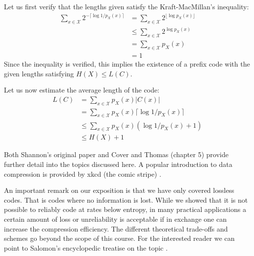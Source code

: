 \begin{solution}
Let us first verify that the lengths given satisfy the Kraft-MacMillan's inequality:
\begin{align}
\sum_{x\in\mathcal X}2^{-\lceil \log 1/p_X(x)\rceil}&=\sum_{x\in\mathcal X}2^{\lfloor \log p_X(x)\rfloor}\\
&\leq \sum_{x\in\mathcal X}2^{\log p_X(x)}\\
&=\sum_{x\in\mathcal X}{p_X(x)}\\
&=1
\end{align}
Since the inequality is verified, this implies the existence of a prefix code with the given lengths satisfying $H(X)\leq L(C)$. 

Let us now estimate the average length of the code:
\begin{align}
L(C)&=\sum_{x\in\mathcal X}p_X(x)|C(x)|\\
    &=\sum_{x\in\mathcal X}p_X(x)\lceil \log 1/p_X(x)\rceil\\
    &\leq \sum_{x\in\mathcal X}p_X(x) (\log 1/p_X(x)+1)\\
    &\leq H(X)+1
\end{align}
\end{solution}
\label{sec:frsc}
Both Shannon's original paper \cite{Shannon_48} and Cover and Thomas \cite{Cover_91} (chapter 5) provide further detail into the topics discussed here. A popular introduction to data compression is provided by xkcd (the comic stripe) \cite{xkcd}. %

An important remark on our exposition is that we have only covered lossless codes. That is codes where no information is lost. While we showed that it is not possible to reliably code at rates below entropy, in many practical applications a certain amount of loss or unreliability is acceptable if in exchange one can increase the compression efficiency. The different theoretical trade-offs and schemes go beyond the scope of this course. For the interested reader we can point to Salomon's encyclopedic treatise on the topic \cite{Salomon2010}.


